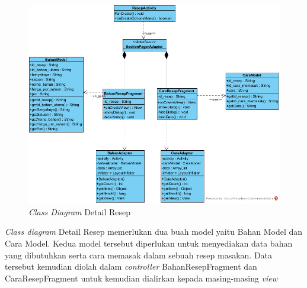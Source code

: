 		\begin{figure}[H]
			\centering
			\includegraphics[origin=c,width=1\textwidth]{gambar/class/DetailResep}
			\caption{\emph{Class Diagram} Detail Resep}
		\end{figure}
		\textit{Class diagram} Detail Resep memerlukan dua buah model yaitu Bahan Model dan Cara Model. Kedua model tersebut diperlukan untuk menyediakan data bahan yang dibutuhkan serta cara memasak dalam sebuah resep masakan. Data tersebut kemudian diolah dalam \textit{controller} BahanResepFragment dan CaraResepFragment untuk kemudian dialirkan kepada masing-masing \textit{view}
